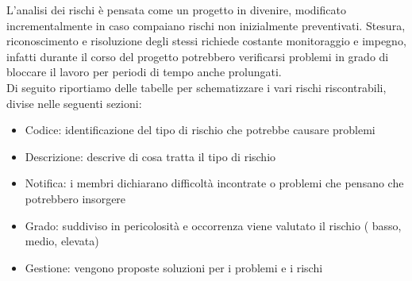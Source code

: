 L'analisi dei rischi è pensata come un progetto in divenire, modificato incrementalmente in caso
compaiano rischi non inizialmente preventivati. 
Stesura, riconoscimento e risoluzione degli stessi richiede costante monitoraggio e impegno, infatti
durante il corso del progetto potrebbero verificarsi problemi in grado di bloccare il lavoro per 
periodi di tempo anche prolungati. \\ Di seguito riportiamo delle tabelle per schematizzare i vari rischi riscontrabili, divise nelle 
seguenti sezioni:
\begin{itemize}
   \item Codice: identificazione del tipo di rischio che potrebbe causare problemi
   \item Descrizione: descrive di cosa tratta il tipo di rischio
   \item Notifica: i membri dichiarano difficoltà incontrate o problemi che pensano che potrebbero insorgere
   \item Grado: suddiviso in pericolosità e occorrenza viene valutato il rischio ( basso, medio, elevata)
   \item Gestione: vengono proposte soluzioni per i problemi e i rischi
\end{itemize}

